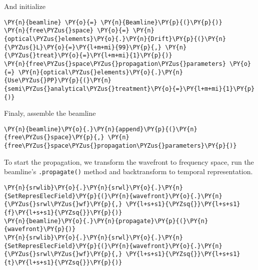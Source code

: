     And initialize

    \begin{tcolorbox}[breakable, size=fbox, boxrule=1pt, pad at break*=1mm,colback=cellbackground, colframe=cellborder]
\begin{Verbatim}[commandchars=\\\{\}]
\PY{n}{beamline} \PY{o}{=} \PY{n}{Beamline}\PY{p}{(}\PY{p}{)}
\PY{n}{free\PYZus{}space} \PY{o}{=} \PY{n}{optical\PYZus{}elements}\PY{o}{.}\PY{n}{Drift}\PY{p}{(}\PY{n}{\PYZus{}L}\PY{o}{=}\PY{l+m+mi}{99}\PY{p}{,} \PY{n}{\PYZus{}treat}\PY{o}{=}\PY{l+m+mi}{1}\PY{p}{)}
\PY{n}{free\PYZus{}space\PYZus{}propagation\PYZus{}parameters} \PY{o}{=} \PY{n}{optical\PYZus{}elements}\PY{o}{.}\PY{n}{Use\PYZus{}PP}\PY{p}{(}\PY{n}{semi\PYZus{}analytical\PYZus{}treatment}\PY{o}{=}\PY{l+m+mi}{1}\PY{p}{)}
\end{Verbatim}
\end{tcolorbox}

    Finaly, assemble the beamline

    \begin{tcolorbox}[breakable, size=fbox, boxrule=1pt, pad at break*=1mm,colback=cellbackground, colframe=cellborder]
\begin{Verbatim}[commandchars=\\\{\}]
\PY{n}{beamline}\PY{o}{.}\PY{n}{append}\PY{p}{(}\PY{n}{free\PYZus{}space}\PY{p}{,} \PY{n}{free\PYZus{}space\PYZus{}propagation\PYZus{}parameters}\PY{p}{)}
\end{Verbatim}
\end{tcolorbox}

    To start the propagation, we transform the wavefront to frequency space,
run the beamline's \texttt{.propagate()} method and backtransform to
temporal representation.

    \begin{tcolorbox}[breakable, size=fbox, boxrule=1pt, pad at break*=1mm,colback=cellbackground, colframe=cellborder]
\begin{Verbatim}[commandchars=\\\{\}]
\PY{n}{srwlib}\PY{o}{.}\PY{n}{srwl}\PY{o}{.}\PY{n}{SetRepresElecField}\PY{p}{(}\PY{n}{wavefront}\PY{o}{.}\PY{n}{\PYZus{}srwl\PYZus{}wf}\PY{p}{,} \PY{l+s+s1}{\PYZsq{}}\PY{l+s+s1}{f}\PY{l+s+s1}{\PYZsq{}}\PY{p}{)}
\PY{n}{beamline}\PY{o}{.}\PY{n}{propagate}\PY{p}{(}\PY{n}{wavefront}\PY{p}{)}
\PY{n}{srwlib}\PY{o}{.}\PY{n}{srwl}\PY{o}{.}\PY{n}{SetRepresElecField}\PY{p}{(}\PY{n}{wavefront}\PY{o}{.}\PY{n}{\PYZus{}srwl\PYZus{}wf}\PY{p}{,} \PY{l+s+s1}{\PYZsq{}}\PY{l+s+s1}{t}\PY{l+s+s1}{\PYZsq{}}\PY{p}{)}
\end{Verbatim}
\end{tcolorbox}

